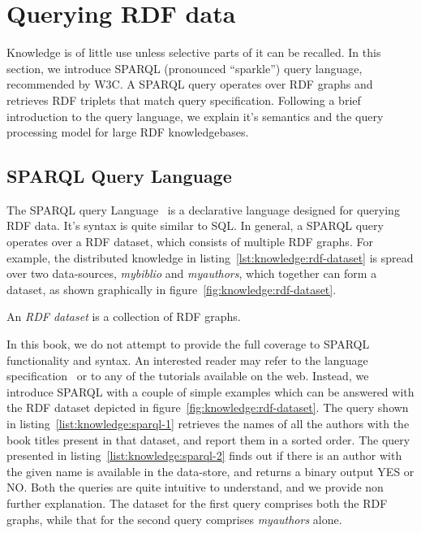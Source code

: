 \section{Querying RDF data}

 
Knowledge is of little use unless selective parts of it can be recalled. In this section, we introduce SPARQL (pronounced ``sparkle'')
query language, recommended by W3C. A SPARQL query operates over RDF graphs and retrieves RDF triplets that match query specification. 
Following a brief introduction to the query language, we explain it's semantics and the query processing model for large RDF knowledgebases.

\subsection{SPARQL Query Language}

The SPARQL query Language~\citep{SPARQL:2013} is a declarative language designed for querying RDF data. It's syntax is quite similar 
to SQL. In general, 
a SPARQL query operates over a RDF dataset, which consists of multiple RDF graphs. For example, the distributed knowledge in 
listing~\ref{lst:knowledge:rdf-dataset} is spread over two data-sources, {\it mybiblio} and {\it myauthors}, which together can 
form a dataset, as shown graphically in figure~\ref{fig:knowledge:rdf-dataset}. 

\begin{definition} 
 	An {\em RDF dataset} is a collection of RDF graphs. 
\end{definition}
 
\noindent

In this book, we do not attempt to provide the full coverage to SPARQL functionality and syntax. An interested reader may refer to 
the language specification~\citep{SPARQL:2013} or to any of the tutorials available on the web. Instead, we introduce SPARQL with a 
couple of simple examples which can be answered with the RDF dataset depicted in figure~\ref{fig:knowledge:rdf-dataset}. 
%
The query shown in listing~\ref{list:knowledge:sparql-1} retrieves the names of all the authors with the book titles present in that 
dataset, and report them in a sorted order. 
The query presented in listing~\ref{list:knowledge:sparql-2} finds out if there is an author with the given name is available in the 
data-store, and returns a binary output YES or NO.
Both the queries are quite intuitive to understand, and we provide non further explanation.
%
The dataset for the first query comprises both the RDF graphs, while that for the second query comprises {\it myauthors} alone.


